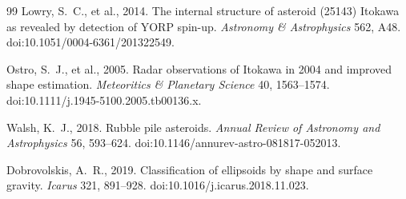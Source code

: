 \documentclass[11pt,a4paper]{article}
\begin{document}
\begin{thebibliography}{99}
Lowry, S.~C., et al., 2014. The internal structure of asteroid (25143)
Itokawa as revealed by detection of YORP spin-up. \emph{Astronomy \&
Astrophysics} 562, A48. doi:10.1051/0004-6361/201322549.

Ostro, S.~J., et al., 2005. Radar observations of Itokawa in 2004 and
improved shape estimation. \emph{Meteoritics \& Planetary Science} 40,
1563--1574. doi:10.1111/j.1945-5100.2005.tb00136.x.

Walsh, K.~J., 2018. Rubble pile asteroids. \emph{Annual Review of
Astronomy and Astrophysics} 56, 593--624.
doi:10.1146/annurev-astro-081817-052013.

Dobrovolskis, A.~R., 2019. Classification of ellipsoids by shape
and surface gravity. \emph{Icarus} 321, 891--928.
doi:10.1016/j.icarus.2018.11.023.

\end{thebibliography}
\end{document}
